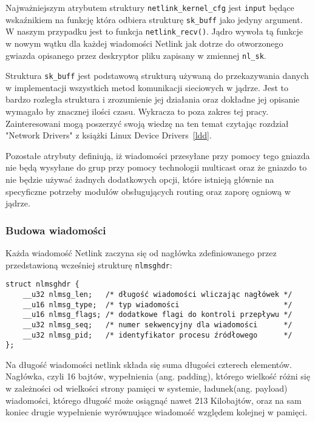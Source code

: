 \documentclass[10pt]{scrartcl}
\begin{document}
Najważniejszym atrybutem struktury \texttt{netlink\_kernel\_cfg} jest \texttt{input} będące wskaźnikiem na funkcję która odbiera strukturę \texttt{sk\_buff} jako jedyny argument. W naszym przypadku jest to funkcja \texttt{netlink\_recv()}. Jądro wywoła tą funkcje w nowym wątku dla każdej wiadomości Netlink jak dotrze do otworzonego gwiazda opisanego przez deskryptor pliku zapisany w zmiennej \texttt{nl\_sk}.

Struktura \texttt{sk\_buff} jest podstawową strukturą używaną do przekazywania danych w implementacji wszystkich metod komunikacji sieciowych w jądrze. Jest to bardzo rozległa struktura i zrozumienie jej działania oraz dokładne jej opisanie wymagało by znacznej ilości czasu.  Wykracza to poza zakres tej pracy. Zainteresowani mogą poszerzyć swoją wiedzę na ten temat czytając rozdział "Network Drivers" z książki Linux Device Drivers~\ref{ldd}.

Pozostałe atrybuty definiują, iż wiadomości przesyłane przy pomocy tego gniazda nie będą wysyłane do grup przy pomocy technologii multicast oraz że gniazdo to nie będzie używać żadnych dodatkowych opcji, które istnieją głównie na specyficzne potrzeby modułów obsługujących routing oraz zaporę ogniową w jądrze.

\subsubsection{Budowa wiadomości}
\label{msgbuild}

Każda wiadomość Netlink zaczyna się od nagłówka zdefiniowanego przez przedstawioną wcześniej strukturę \texttt{nlmsghdr}:

\begin{verbatim}
struct nlmsghdr {
    __u32 nlmsg_len;   /* długość wiadomości wliczając nagłówek */
    __u16 nlmsg_type;  /* typ wiadomości                        */
    __u16 nlmsg_flags; /* dodatkowe flagi do kontroli przepływu */
    __u32 nlmsg_seq;   /* numer sekwencyjny dla wiadomości      */
    __u32 nlmsg_pid;   /* identyfikator procesu źródłowego      */
};
\end{verbatim}

Na długość wiadomości netlink składa się suma długości czterech elementów. Nagłówka, czyli 16 bajtów, wypełnienia (ang. padding), którego wielkość różni się w zależności od wielkości strony pamięci w systemie, ładunek(ang. payload) wiadomości, którego długość może osiągnąć nawet 213 Kilobajtów, oraz na sam koniec drugie wypełnienie wyrównujące wiadomość względem kolejnej w pamięci.
\end{document}
